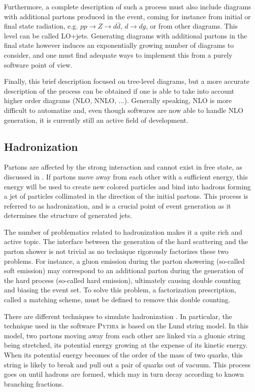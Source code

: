     Furthermore, a complete description of such a process must also include
    diagrams with additional partons produced in the event, coming for instance
    from initial or final state radiation, e.g. $pp \rightarrow Z \rightarrow
    d\bar{d}$, $d\rightarrow dg$, or from other diagrams. This level can be called
    LO+jets. Generating diagrams with additional partons in the final state however
    induces an exponentially growing number of diagrams to consider, and one must
    find adequate ways to implement this from a purely software point of view.

    Finally, this brief description focused on tree-level diagrams, but a more accurate
    description of the process can be obtained if one is able to take into account higher order
    diagrams (NLO, NNLO, ...). Generally speaking, NLO is more difficult to
    automatize and, even though softwares are now able to handle NLO generation, it is
    currently still an active field of development.

    \subsection{Hadronization}

    Partons are affected by the strong interaction and cannot exist in free state,
    as discussed in . If partons move away from
    each other with a sufficient energy, this energy will be used to create new colored
    particles and bind into hadrons forming a jet of particles collimated in the
    direction of the initial partons. This process is referred to as hadronization,
    and is a crucial point of event generation as it determines the structure
    of generated jets.

    The number of problematics related to hadronization makes it a quite rich and
    active topic. The interface between the generation of the hard scattering
    and the parton shower is not trivial as no technique rigorously factorizes
    these two problems. For instance, a gluon emission during
    the parton showering (so-called soft emission) may correspond to an additional
    parton during the generation of the hard process (so-called hard emission),
    ultimately causing double counting and biasing the event set. To solve this
    problem, a factorization prescription, called a matching scheme, must be defined
    to remove this double counting.

    There are different techniques to simulate hadronization \cite{MCGenPDG}. In particular, the
    technique used in the software \textsc{Pythia} is based on the Lund string
    model. In this model, two partons moving away from each other are linked
    via a gluonic string being stretched, its potential energy growing at
    the expense of its kinetic energy. When its potential energy becomes of the
    order of the mass of two quarks, this string is likely to break and pull
    out a pair of quarks out of vacuum. This process goes on until
    hadrons are formed, which may in turn decay according to known branching
    fractions.

